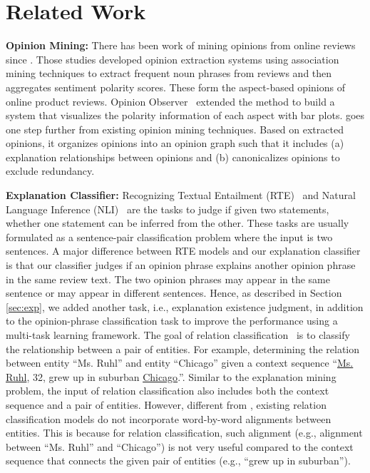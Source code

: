 \section{Related Work}\label{sec:related}
\noindent
{\bf Opinion Mining:} There has been work of mining opinions from online reviews since \cite{hu2004kdd, hu2004aaai, qiu2011coling, liu2012sentiment, pontiki2015semeval, pontiki2016semeval, xu2019bert}. Those studies developed opinion extraction systems using association mining techniques to extract frequent noun phrases from reviews and then aggregates sentiment polarity scores. These form the aspect-based opinions of online product reviews. 
Opinion Observer~\cite{Liu:2005:OpinionObserver} extended the method to build a system that visualizes the polarity information of each aspect with bar plots. 
\system{} goes one step further from existing opinion mining techniques. Based on extracted opinions, it organizes opinions into an opinion graph such that it includes (a) explanation relationships between opinions and (b) canonicalizes opinions to exclude redundancy. 

\noindent
{\bf Explanation Classifier:} Recognizing Textual Entailment (RTE)~\cite{Dagan:2005:PascalRTE} and Natural Language Inference (NLI)~\cite{snli:emnlp2015} are the tasks to judge if given two statements, whether one statement can be inferred from the other. 
These tasks are usually formulated as a sentence-pair classification problem where the input is two sentences.
A major difference between RTE models and our explanation classifier is that our classifier judges if an opinion phrase explains another opinion phrase in the same review text.  The two opinion phrases may appear in the same sentence or may appear in different sentences. Hence, as described in Section \ref{sec:exp}, we added another task, i.e., explanation existence judgment, in addition to the opinion-phrase classification task to improve the performance using a multi-task learning framework. The goal of relation classification~\cite{zhou2016attention, lin2016neural, wu2019enriching} is to classify the relationship between a pair of entities. For example, determining the relation between entity ``Ms. Ruhl'' and entity ``Chicago'' given a context sequence ``\underline{Ms. Ruhl}, 32, grew up in suburban \underline{Chicago}.''. Similar to the explanation mining problem, the input of relation classification also includes both the context sequence and a pair of entities. However, different from \expcls, existing relation classification models do not incorporate word-by-word alignments between entities. This is because for relation classification, such alignment (e.g., alignment between ``Ms. Ruhl'' and ``Chicago'') is not very useful compared to the context sequence that connects the given pair of entities (e.g., ``grew up in suburban''). 

